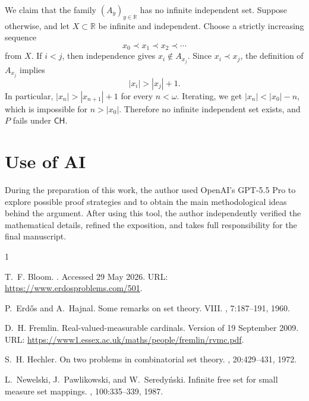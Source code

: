 \documentclass{amsart}
\theoremstyle{plain}
\theoremstyle{definition}
\newcommand{\R}{\mathbb{R}}
\newcommand{\CH}{\mathsf{CH}}
\begin{document}
We claim that the family $(A_y)_{y\in\R}$ has no infinite independent set.
Suppose otherwise, and let $X\subset\R$ be infinite and independent.
Choose a strictly increasing sequence
\[
x_0\prec x_1\prec x_2\prec\cdots
\]
from $X$.
If $i<j$, then independence gives $x_i\notin A_{x_j}$.
Since $x_i\prec x_j$, the definition of $A_{x_j}$ implies
\[
|x_i|>|x_j|+1.
\]
In particular, $|x_n|>|x_{n+1}|+1$ for every $n<\omega$.
Iterating, we get $|x_n|<|x_0|-n$, which is impossible for $n>|x_0|$.
Therefore no infinite independent set exists, and $P$ fails under $\CH$.

\section*{Use of AI}

During the preparation of this work, the author used OpenAI's GPT-5.5 Pro to explore possible proof strategies and to obtain the main methodological ideas behind the argument.
After using this tool, the author independently verified the mathematical details, refined the exposition, and takes full responsibility for the final manuscript.


\begin{thebibliography}{1}

T.~F. Bloom.
.
\newblock Accessed 29 May 2026.
\newblock URL: \url{https://www.erdosproblems.com/501}.

P.~Erd\H{o}s and A.~Hajnal.
\newblock Some remarks on set theory. {VIII}.
, 7:187--191, 1960.

D.~H. Fremlin.
\newblock Real-valued-measurable cardinals.
\newblock Version of 19 September 2009.
\newblock URL: \url{https://www1.essex.ac.uk/maths/people/fremlin/rvmc.pdf}.

S.~H. Hechler.
\newblock On two problems in combinatorial set theory.
, 20:429--431, 1972.

L.~Newelski, J.~Pawlikowski, and W.~Seredy\'nski.
\newblock Infinite free set for small measure set mappings.
, 100:335--339, 1987.

\end{thebibliography}
\end{document}
